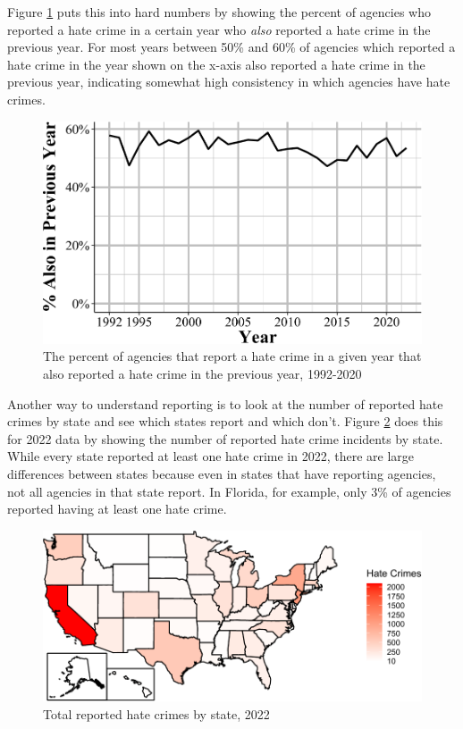 \documentclass[
  12pt,
  openany]{book}
\begin{document}
Figure \ref{fig:hateCrimesPreviousYear} puts this into hard numbers by showing the percent of agencies who reported a hate crime in a certain year who \emph{also} reported a hate crime in the previous year. For most years between 50\% and 60\% of agencies which reported a hate crime in the year shown on the x-axis also reported a hate crime in the previous year, indicating somewhat high consistency in which agencies have hate crimes.

\begin{figure}

{\centering \includegraphics[width=0.9\linewidth]{09_hate_crime_files/figure-latex/hateCrimesPreviousYear-1} 

}

\caption{The percent of agencies that report a hate crime in a given year that also reported a hate crime in the previous year, 1992-2020}\label{fig:hateCrimesPreviousYear}
\end{figure}

Another way to understand reporting is to look at the number of reported hate crimes by state and see which states report and which don't. Figure \ref{fig:hateCrimesMap} does this for 2022 data by showing the number of reported hate crime incidents by state. While every state reported at least one hate crime in 2022, there are large differences between states because even in states that have reporting agencies, not all agencies in that state report. In Florida, for example, only 3\% of agencies reported having at least one hate crime.

\begin{figure}

{\centering \includegraphics[width=0.9\linewidth]{09_hate_crime_files/figure-latex/hateCrimesMap-1} 

}

\caption{Total reported hate crimes by state, 2022}\label{fig:hateCrimesMap}
\end{figure}
\end{document}
